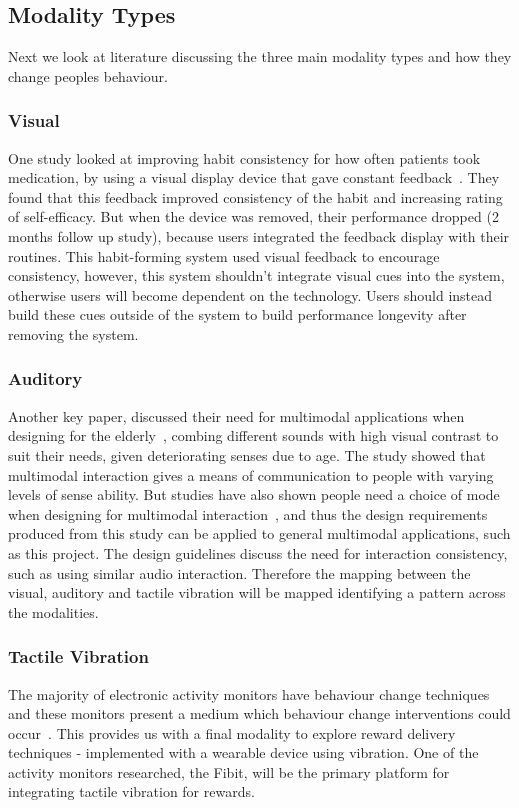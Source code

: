 \subsection{Modality Types}
Next we look at literature discussing the three main modality types and how they change peoples behaviour.

\subsubsection*{Visual}
One study looked at improving habit consistency for how often patients took medication, by using a visual display device that gave constant feedback~\cite{article_realtime_feedback_improving_medication_taking}. They found that this feedback improved consistency of the habit and increasing rating of self-efficacy. But when the device was removed, their performance dropped (2 months follow up study), because users integrated the feedback display with their routines. This habit-forming system used visual feedback to encourage consistency, however, this system shouldn't integrate visual cues into the system, otherwise users will become dependent on the technology. Users should instead build these cues outside of the system to build performance longevity after removing the system.

\subsubsection*{Auditory}
Another key paper, discussed their need for multimodal applications when designing for the elderly~\cite{article_movipill_improving_medication_elders}, combing different sounds with high visual contrast to suit their needs, given deteriorating senses due to age. The study showed that multimodal interaction gives a means of communication to people with varying levels of sense ability. But studies have also shown people need a choice of mode when designing for multimodal interaction~\cite{article_user_centred_multimodal_reminders}, and thus the design requirements produced from this study can be applied to general multimodal applications, such as this project. The design guidelines discuss the need for interaction consistency, such as using similar audio interaction. Therefore the mapping between the visual, auditory and tactile vibration will be mapped identifying a pattern across the modalities.

\subsubsection*{Tactile Vibration}
The majority of electronic activity monitors have behaviour change techniques and these monitors present a medium which behaviour change interventions could occur~\cite{article_wearable_good}. This provides us with a final modality to explore reward delivery techniques - implemented with a wearable device using vibration. One of the activity monitors researched, the Fibit, will be the primary platform for integrating tactile vibration for rewards.

